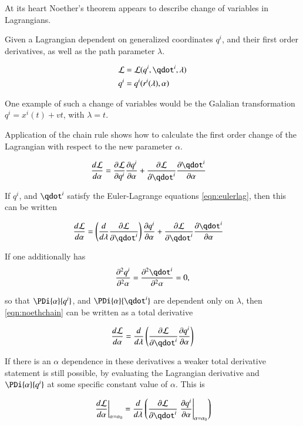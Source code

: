 \documentclass{article}
\begin{document}
At its heart Noether's theorem appears to describe change of variables in
Lagrangians.

Given a Lagrangian dependent on generalized coordinates $q^i$, and their
first order derivatives, as well as the path parameter $\lambda$.

\begin{align*}
\LL &= \LL(q^i, \qdot^i, \lambda) \\
q^i &= q^i(r^i(\lambda), \alpha)
\end{align*}

One 
example of such a change of variables would be the Galalian transformation $q^i = x^i(t) + v t$, with $\lambda = t$.

Application of the chain rule shows how to calculate the first order change
of the Lagrangian with respect to the new parameter $\alpha$.

\begin{align}\label{eqn:nothFirstChain}
\frac{d\LL}{d\alpha}
&=
\PD{q^i}{\LL} \PD{\alpha}{q^i}
+\PD{\qdot^i}{\LL} \PD{\alpha}{\qdot^i}
\end{align}

If $q^i$, and $\qdot^i$ satisfy the Euler-Lagrange equations \ref{eqn:eulerlag}, then this can be written

\begin{align}\label{eqn:noethchain}
\frac{d\LL}{d\alpha}
&=
\left(\frac{d}{d\lambda} \PD{\qdot^i}{\LL}\right)
\PD{\alpha}{q^i}
+\PD{\qdot^i}{\LL} \PD{\alpha}{\qdot^i}
\end{align}

If one additionally has
\begin{align*}
\PDsq{\alpha}{q^i} =\PDsq{\alpha}{\qdot^i} = 0,
\end{align*}

so that $\PDi{\alpha}{q^i}$, and $\PDi{\alpha}{\qdot^i}$ are dependent only
on $\lambda$, then \ref{eqn:noethchain} can be written as a total derivative

\begin{align}\label{eqn:noethTotalDer}
\frac{d\LL}{d\alpha} = \frac{d}{d\lambda} \left( \PD{\qdot^i}{\LL} \PD{\alpha}{q^i} \right)
\end{align}

If there is an $\alpha$ dependence in these derivatives a weaker total derivative statement is still possible, by evaluating the 
Lagrangian derivative and $\PDi{\alpha}{q^i}$ at some specific constant value of $\alpha$.  This is

\begin{align*}
\left.\frac{d\LL}{d\alpha}\right\vert_{\alpha = \alpha_0} = \frac{d}{d\lambda} \left( \PD{\qdot^i}{\LL} \left.\PD{\alpha}{q^i}\right\vert_{\alpha = \alpha_0} \right)
\end{align*}
\end{document}

